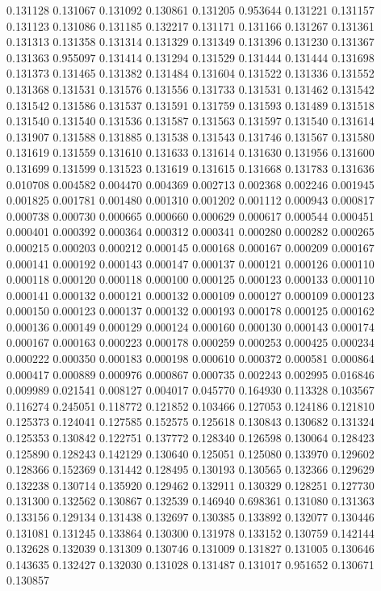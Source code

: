 0.131128
0.131067
0.131092
0.130861
0.131205
0.953644
0.131221
0.131157
0.131123
0.131086
0.131185
0.132217
0.131171
0.131166
0.131267
0.131361
0.131313
0.131358
0.131314
0.131329
0.131349
0.131396
0.131230
0.131367
0.131363
0.955097
0.131414
0.131294
0.131529
0.131444
0.131444
0.131698
0.131373
0.131465
0.131382
0.131484
0.131604
0.131522
0.131336
0.131552
0.131368
0.131531
0.131576
0.131556
0.131733
0.131531
0.131462
0.131542
0.131542
0.131586
0.131537
0.131591
0.131759
0.131593
0.131489
0.131518
0.131540
0.131540
0.131536
0.131587
0.131563
0.131597
0.131540
0.131614
0.131907
0.131588
0.131885
0.131538
0.131543
0.131746
0.131567
0.131580
0.131619
0.131559
0.131610
0.131633
0.131614
0.131630
0.131956
0.131600
0.131699
0.131599
0.131523
0.131619
0.131615
0.131668
0.131783
0.131636
0.010708
0.004582
0.004470
0.004369
0.002713
0.002368
0.002246
0.001945
0.001825
0.001781
0.001480
0.001310
0.001202
0.001112
0.000943
0.000817
0.000738
0.000730
0.000665
0.000660
0.000629
0.000617
0.000544
0.000451
0.000401
0.000392
0.000364
0.000312
0.000341
0.000280
0.000282
0.000265
0.000215
0.000203
0.000212
0.000145
0.000168
0.000167
0.000209
0.000167
0.000141
0.000192
0.000143
0.000147
0.000137
0.000121
0.000126
0.000110
0.000118
0.000120
0.000118
0.000100
0.000125
0.000123
0.000133
0.000110
0.000141
0.000132
0.000121
0.000132
0.000109
0.000127
0.000109
0.000123
0.000150
0.000123
0.000137
0.000132
0.000193
0.000178
0.000125
0.000162
0.000136
0.000149
0.000129
0.000124
0.000160
0.000130
0.000143
0.000174
0.000167
0.000163
0.000223
0.000178
0.000259
0.000253
0.000425
0.000234
0.000222
0.000350
0.000183
0.000198
0.000610
0.000372
0.000581
0.000864
0.000417
0.000889
0.000976
0.000867
0.000735
0.002243
0.002995
0.016846
0.009989
0.021541
0.008127
0.004017
0.045770
0.164930
0.113328
0.103567
0.116274
0.245051
0.118772
0.121852
0.103466
0.127053
0.124186
0.121810
0.125373
0.124041
0.127585
0.152575
0.125618
0.130843
0.130682
0.131324
0.125353
0.130842
0.122751
0.137772
0.128340
0.126598
0.130064
0.128423
0.125890
0.128243
0.142129
0.130640
0.125051
0.125080
0.133970
0.129602
0.128366
0.152369
0.131442
0.128495
0.130193
0.130565
0.132366
0.129629
0.132238
0.130714
0.135920
0.129462
0.132911
0.130329
0.128251
0.127730
0.131300
0.132562
0.130867
0.132539
0.146940
0.698361
0.131080
0.131363
0.133156
0.129134
0.131438
0.132697
0.130385
0.133892
0.132077
0.130446
0.131081
0.131245
0.133864
0.130300
0.131978
0.133152
0.130759
0.142144
0.132628
0.132039
0.131309
0.130746
0.131009
0.131827
0.131005
0.130646
0.143635
0.132427
0.132030
0.131028
0.131487
0.131017
0.951652
0.130671
0.130857
